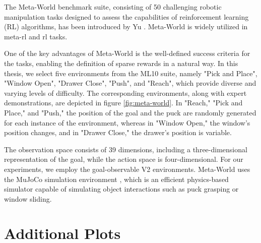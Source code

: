   


The Meta-World benchmark suite, consisting of 50 challenging robotic manipulation tasks designed to assess the capabilities of reinforcement learning (RL) algorithms, 
has been introduced by Yu \etAl \cite{yu2019meta}. Meta-World is widely utilized in meta-\ac{rl} and \ac{rl} tasks.

One of the key advantages of Meta-World is the well-defined success criteria for the tasks, enabling the definition of sparse rewards in a natural way. 
In this thesis, we select five environments from the ML10 suite, namely "Pick and Place", "Window Open", "Drawer Close", "Push", and "Reach", which provide diverse and varying levels of 
difficulty. The corresponding environments, along with expert demonstrations, are depicted in figure \ref{fig:meta-world}. In "Reach," "Pick and Place," and "Push," the position of the goal 
and the puck are randomly generated for each instance of the environment, whereas in "Window Open," the window's position changes, and in "Drawer Close," the drawer's position is variable.

The observation space consists of 39 dimensions, including a three-dimensional representation of the goal, while the action space is four-dimensional. For our experiments, 
we employ the goal-observable V2 environments. Meta-World uses the MuJoCo simulation environment \cite{todorov2012mujoco}, which is an efficient physics-based 
simulator capable of simulating object interactions such as puck grasping or window sliding.

\chapter{Additional Plots}
\label{chapter:additional_plots}

